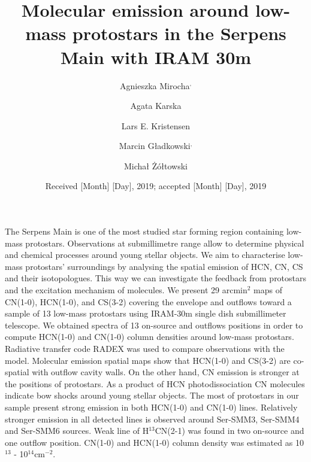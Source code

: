 \documentclass{aa}
\begin{document}
 


   \title{Molecular emission around low-mass protostars in the Serpens Main with IRAM 30m}

   \subtitle{}

   \author{Agnieszka Mirocha$^,$
	  \and
          Agata Karska
	  \and
	  Lars E. Kristensen
	  \and
	  Marcin Gładkowski$^,$
	  \and
	  Michał Żółtowski
          }


   \date{Received [Month] [Day], 2019; accepted [Month] [Day], 2019}

 
  \abstract
   {The Serpens Main is one of the most studied star forming region containing low-mass protostars. Observations at submillimetre range allow to determine physical and chemical processes around young stellar objects.} %
   {We aim to characterise low-mass protostars’ surroundings by analysing the spatial emission of HCN, CN, CS and their isotopologues. This way we can investigate the feedback from protostars and the excitation mechanism of molecules. }
   {We present 29 arcmin$^2$ maps of CN(1-0), HCN(1-0), and CS(3-2) covering the envelope and outflows toward a sample of 13 low-mass protostars using IRAM-30m single dish submillimeter telescope. We obtained spectra of 13 on-source and outflows positions in order to compute HCN(1-0) and CN(1-0) column densities around low-mass protostars. Radiative transfer code RADEX was used to compare observations with the model.}
   {Molecular emission spatial maps show that HCN(1-0) and CS(3-2) are co-spatial with outflow cavity walls. On the other hand, CN emission is stronger at the positions of protostars. As a product of HCN photodissociation CN molecules indicate bow shocks around young stellar objects. The most of protostars in our sample present strong emission in both HCN(1-0) and CN(1-0) lines. Relatively stronger emission in all detected lines is observed around Ser-SMM3, Ser-SMM4 and Ser-SMM6 sources. Weak line of H$^{13}$CN(2-1) was found in two on-source and one outflow position. CN(1-0) and HCN(1-0) column density was estimated as 10$^{13}$ - 10$^{14}$cm$^{-2}$. }
   {}
\end{document}

